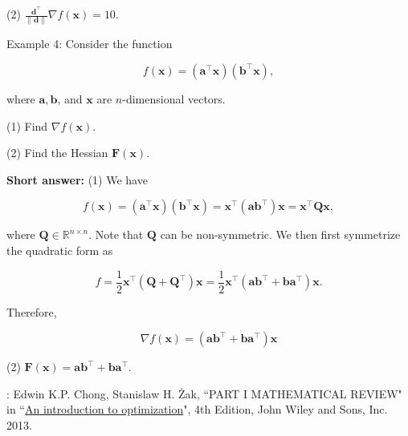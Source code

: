 (2) \(\frac{\boldsymbol{d}^{\top}}{\|\boldsymbol{d}\|} \nabla f(\boldsymbol{x})=10\).


\bigskip
\noindent
Example 4: Consider the function

\begin{equation*}
	f(\boldsymbol{x})=\left(\boldsymbol{a}^{\top} \boldsymbol{x}\right)\left(\boldsymbol{b}^{\top} \boldsymbol{x}\right),
\end{equation*}

where \(\boldsymbol{a}, \boldsymbol{b}\), and \(\boldsymbol{x}\) are \(n\)-dimensional vectors.

(1) Find \(\nabla f(\boldsymbol{x})\).

(2) Find the Hessian \(\boldsymbol{F}(\boldsymbol{x})\).

\noindent
\textbf{Short answer:}
(1) We have

\begin{equation*}
	f(\boldsymbol{x})=\left(\boldsymbol{a}^{\top} \boldsymbol{x}\right)\left(\boldsymbol{b}^{\top} \boldsymbol{x}\right)=\boldsymbol{x}^{\top}\left(\boldsymbol{a} \boldsymbol{b}^{\top}\right) \boldsymbol{x}=\boldsymbol{x}^{\top} \boldsymbol{Q} \boldsymbol{x},
\end{equation*}

where \(\boldsymbol{Q} \in \mathbb{R}^{n \times n}\). Note that \(\boldsymbol{Q}\) can be non-symmetric. We then first symmetrize the quadratic form as

\begin{equation*}
	f=\frac{1}{2} \boldsymbol{x}^{\top}\left(\boldsymbol{Q}+\boldsymbol{Q}^{\top}\right) \boldsymbol{x}=\frac{1}{2} \boldsymbol{x}^{\top}\left(\boldsymbol{a} \boldsymbol{b}^{\top}+\boldsymbol{b} \boldsymbol{a}^{\top}\right) \boldsymbol{x} .
\end{equation*}

Therefore,

\begin{equation*}
	\nabla f(\boldsymbol{x})=\left(\boldsymbol{a} \boldsymbol{b}^{\top}+\boldsymbol{b} \boldsymbol{a}^{\top}\right) \boldsymbol{x}
\end{equation*}

(2) \(\boldsymbol{F}(\boldsymbol{x})=\boldsymbol{a} \boldsymbol{b}^{\top}+\boldsymbol{b} \boldsymbol{a}^{\top}\).

\bigskip

\noindent
[Ref]: Edwin K.P. Chong, Stanislaw H. Żak, ``PART I MATHEMATICAL REVIEW" in ``\href{https://www.amazon.com/Introduction-Optimization-Edwin-K-Chong/dp/1118279018}{An introduction to optimization}", 4th Edition, John Wiley and Sons, Inc. 2013.
